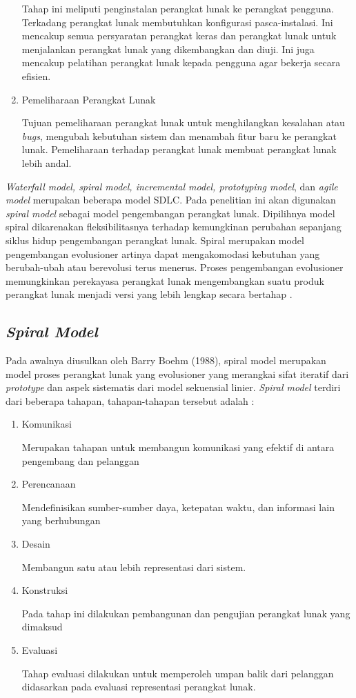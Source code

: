 \begin{enumerate}
	Tahap ini meliputi penginstalan perangkat lunak ke perangkat pengguna. Terkadang perangkat lunak membutuhkan konfigurasi pasca-instalasi. Ini mencakup semua persyaratan perangkat keras dan perangkat lunak untuk menjalankan perangkat lunak yang dikembangkan dan diuji. Ini juga mencakup pelatihan perangkat lunak kepada pengguna agar bekerja secara efisien.
	\item Pemeliharaan Perangkat Lunak
	
	Tujuan pemeliharaan perangkat lunak untuk menghilangkan kesalahan atau \textit{bugs}, mengubah kebutuhan sistem dan menambah fitur baru ke perangkat lunak. Pemeliharaan terhadap perangkat lunak membuat perangkat lunak lebih andal.
\end{enumerate}
  
\textit{Waterfall model, spiral model, incremental model, prototyping model}, dan \textit{agile model} merupakan beberapa model SDLC. Pada penelitian ini akan digunakan \textit{spiral model} sebagai model pengembangan perangkat lunak. Dipilihnya model spiral dikarenakan fleksibilitasnya terhadap kemungkinan perubahan sepanjang siklus hidup pengembangan perangkat lunak. Spiral merupakan model pengembangan evolusioner artinya dapat mengakomodasi kebutuhan yang berubah-ubah atau berevolusi terus menerus. Proses pengembangan evolusioner memungkinkan perekayasa perangkat lunak mengembangkan suatu produk perangkat lunak menjadi versi yang lebih lengkap secara bertahap \cite{Made}. 


\subsection{\emph{Spiral Model}} 

Pada awalnya diusulkan oleh Barry Boehm (1988), spiral model merupakan model proses perangkat lunak yang evolusioner yang merangkai sifat iteratif dari \textit{prototype} dan aspek sistematis dari model sekuensial linier. \textit{Spiral model} terdiri dari beberapa tahapan, tahapan-tahapan tersebut adalah \cite{Pressman}:

\begin{enumerate}
	\item Komunikasi

	Merupakan tahapan untuk membangun komunikasi yang efektif di antara pengembang dan pelanggan
	\item Perencanaan
	
	Mendefinisikan sumber-sumber daya, ketepatan waktu, dan informasi lain yang berhubungan
	\item Desain
	
	Membangun satu atau lebih representasi dari sistem. 
	\item Konstruksi 
	
	Pada tahap ini dilakukan pembangunan dan pengujian perangkat lunak yang dimaksud
	\item Evaluasi
	
	Tahap evaluasi dilakukan untuk memperoleh umpan balik dari pelanggan didasarkan pada evaluasi representasi perangkat lunak.
\end{enumerate}

